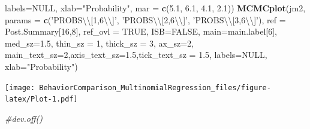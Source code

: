 \documentclass[]{article}
\newenvironment{Shaded}{\begin{snugshade}}{\end{snugshade}}
\newcommand{\CharTok}[1]{\textcolor[rgb]{0.31,0.60,0.02}{#1}}
\newcommand{\CommentTok}[1]{\textcolor[rgb]{0.56,0.35,0.01}{\textit{#1}}}
\newcommand{\DataTypeTok}[1]{\textcolor[rgb]{0.13,0.29,0.53}{#1}}
\newcommand{\DecValTok}[1]{\textcolor[rgb]{0.00,0.00,0.81}{#1}}
\newcommand{\FloatTok}[1]{\textcolor[rgb]{0.00,0.00,0.81}{#1}}
\newcommand{\KeywordTok}[1]{\textcolor[rgb]{0.13,0.29,0.53}{\textbf{#1}}}
\newcommand{\NormalTok}[1]{#1}
\newcommand{\OtherTok}[1]{\textcolor[rgb]{0.56,0.35,0.01}{#1}}
\newcommand{\StringTok}[1]{\textcolor[rgb]{0.31,0.60,0.02}{#1}}
\begin{document}
\begin{Shaded}
\begin{Highlighting}[]
         \DataTypeTok{labels=}\OtherTok{NULL}\NormalTok{, }\DataTypeTok{xlab=}\StringTok{"Probability"}\NormalTok{,}
         \DataTypeTok{mar =} \KeywordTok{c}\NormalTok{(}\FloatTok{5.1}\NormalTok{, }\FloatTok{6.1}\NormalTok{, }\FloatTok{4.1}\NormalTok{, }\FloatTok{2.1}\NormalTok{))}
\KeywordTok{MCMCplot}\NormalTok{(jm2, }\DataTypeTok{params =} \KeywordTok{c}\NormalTok{(}\StringTok{'PROBS}\CharTok{\textbackslash{}\textbackslash{}}\StringTok{[1,6}\CharTok{\textbackslash{}\textbackslash{}}\StringTok{]'}\NormalTok{, }\StringTok{'PROBS}\CharTok{\textbackslash{}\textbackslash{}}\StringTok{[2,6}\CharTok{\textbackslash{}\textbackslash{}}\StringTok{]'}\NormalTok{, }\StringTok{'PROBS}\CharTok{\textbackslash{}\textbackslash{}}\StringTok{[3,6}\CharTok{\textbackslash{}\textbackslash{}}\StringTok{]'}\NormalTok{), }\DataTypeTok{ref =}\NormalTok{ Post.Summary[}\DecValTok{16}\NormalTok{,}\DecValTok{8}\NormalTok{], }
         \DataTypeTok{ref_ovl =} \OtherTok{TRUE}\NormalTok{, }\DataTypeTok{ISB=}\OtherTok{FALSE}\NormalTok{, }
         \DataTypeTok{main=}\NormalTok{main.label[}\DecValTok{6}\NormalTok{],}
         \DataTypeTok{med_sz=}\FloatTok{1.5}\NormalTok{, }\DataTypeTok{thin_sz =} \DecValTok{1}\NormalTok{, }\DataTypeTok{thick_sz =} \DecValTok{3}\NormalTok{, }\DataTypeTok{ax_sz=}\DecValTok{2}\NormalTok{, }\DataTypeTok{main_text_sz=}\DecValTok{2}\NormalTok{,}\DataTypeTok{axis_text_sz=}\FloatTok{1.5}\NormalTok{,}\DataTypeTok{tick_text_sz =} \FloatTok{1.5}\NormalTok{, }
         \DataTypeTok{labels=}\OtherTok{NULL}\NormalTok{, }\DataTypeTok{xlab=}\StringTok{"Probability"}\NormalTok{)}
\end{Highlighting}
\end{Shaded}

\texttt{[image: BehaviorComparison\_MultinomialRegression\_files/figure-latex/Plot-1.pdf]}

\begin{Shaded}
\begin{Highlighting}[]
\CommentTok{#dev.off()}
\end{Highlighting}
\end{Shaded}
\end{document}
